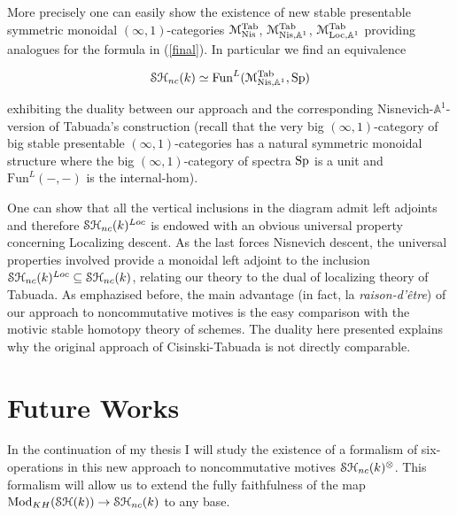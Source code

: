 \begin{refsection}
More precisely  one can easily show the existence of new stable presentable symmetric monoidal  $(\infty,1)$-categories $\mathcal{M}^\mathrm{Tab}_\mathrm{Nis}$, $\mathcal{M}^\mathrm{Tab}_{\mathrm{Nis}, \mathbb{A}^1}$, $\mathcal{M}^\mathrm{Tab}_{\mathrm{Loc}, \mathbb{A}^1}$ providing analogues for the formula in (\ref{final}). In particular we find an equivalence

\begin{equation}
 \mathcal{S}\mathcal{H}_{nc}(k)\simeq \mathrm{Fun}^{L}(\mathcal{M}^\mathrm{Tab}_{\mathrm{Nis}, \mathbb{A}^1}, \mathrm{Sp})
\end{equation}

\noindent exhibiting the duality between our approach and the corresponding Nisnevich-$\mathbb{A}^1$-version of Tabuada's construction (recall that the very big $(\infty,1)$-category of big stable presentable $(\infty,1)$-categories has a natural symmetric monoidal structure \cite[6.3.2.10, 6.3.2.18 and 6.3.1.17]{ha} where the big $(\infty,1)$-category of spectra $\mathrm{Sp}$ is a unit and $\mathrm{Fun}^{L}(-,-)$ is the internal-hom). 


One can show that all the vertical inclusions in the diagram admit left adjoints and therefore $\mathcal{S}\mathcal{H}_{nc}(k)^{Loc}$ is endowed with an obvious universal property concerning Localizing descent. As the last forces Nisnevich descent, the universal properties involved provide a monoidal left adjoint to the inclusion $\mathcal{S}\mathcal{H}_{nc}(k)^{Loc}\subseteq\mathcal{S}\mathcal{H}_{nc}(k)$, relating our theory to the dual of localizing theory of Tabuada. As emphazised before, the main advantage (in fact, la \emph{raison-d'{\^e}tre}) of our approach to noncommutative motives is the easy comparison with the motivic stable homotopy theory of schemes. The duality here presented explains why the original approach of Cisinski-Tabuada is not directly comparable.

\section{Future Works}

In the continuation of my thesis I will study the existence of a formalism of six-operations in this new approach to noncommutative motives $\mathcal{S}\mathcal{H}_{nc}(k)^{\otimes}$. This formalism will allow us to extend the fully faithfulness of the map $\mathrm{Mod}_{KH}(\mathcal{S}\mathcal{H}(k))\to \mathcal{S}\mathcal{H}_{nc}(k)$ to any base.


\printbibliography[heading = local]

\end{refsection}

